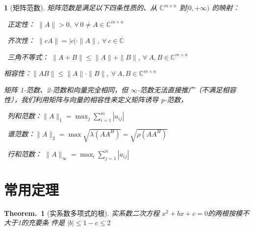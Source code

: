 \documentclass[zihao=5,UTF8]{report}
\def\C{\mathbb{C}}
\theoremstyle{MyTheoremStyle} %
\newtheorem{theorem}{Theorem.\,}
\theoremstyle{MySubsubsectionStyle} %
\newtheorem{definition}{}
\begin{document}
\begin{definition}[矩阵范数]

矩阵范数是满足以下四条性质的、从 $\C^{m\times n}$ 到$[0, +\infty)$ 的映射：

\par{}\ 正定性： $\| A \| >0,\ \forall\  0 \ne A \in \C^{m\times n}$   \par
{}\ 齐次性： $\| cA \| = | c |\cdot \| A \|,\ \forall\  c \in \C$   \par
{}\  三角不等式： $\| A+B \| \leqslant  \| A \| + \| B \|,\ \forall\  A,B \in \C^{m\times n}$   \par
{} 相容性：$\| AB \| \leqslant \| A \|\cdot \| B \|, \ \forall\  A,B \in \C^{m\times n}$   \par\noindent


矩阵 1-范数、2-范数和向量完全相同，但 $\infty$-范数无法直接推广（不满足相容性），我们利用矩阵与向量的相容性来定义矩阵诱导 p-范数，

\par{}\ 列和范数：$\| A \|_1 = \max_{j} \sum_{i=1}^{m} |a_{ij}|$   \par
{}\  谱范数：$\| A \|_2 = \max\sqrt{\lambda(AA^H)} = \sqrt{\rho(AA^H)}$   \par
{}\  行和范数： $\| A \|_{\infty} = \max_{i} \sum_{j=1}^{n} |a_{ij}|$  \par\noindent

\end{definition}

\section{常用定理}

\begin{theorem}[实系数多项式的根]\label{实系数多项式的根}
实系数二次方程 $x^2 + bx + c = 0$的两根按模不大于1的充要条
件是 $|b| \leqslant 1-c \leqslant 2 $

\end{theorem}
\end{document}
